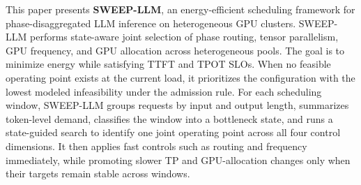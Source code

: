 This paper presents \textbf{SWEEP-LLM}, an energy-efficient scheduling framework for phase-disaggregated LLM inference on heterogeneous GPU clusters.
SWEEP-LLM performs state-aware joint selection of phase routing, tensor parallelism, GPU frequency, and GPU allocation across heterogeneous pools. 
The goal is to minimize energy while satisfying TTFT and TPOT SLOs. 
When no feasible operating point exists at the current load, it prioritizes the configuration with the lowest modeled infeasibility under the admission rule. 
For each scheduling window, SWEEP-LLM groups requests by input and output length, summarizes token-level demand, classifies the window into a bottleneck state, and runs a state-guided search to identify one joint operating point across all four control dimensions. 
It then applies fast controls such as routing and frequency immediately, while promoting slower TP and GPU-allocation changes only when their targets remain stable across windows.
